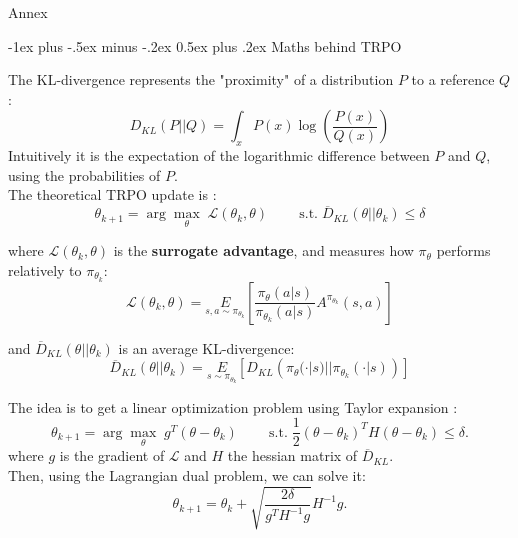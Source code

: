 \documentclass[10pt,landscape]{article}
\makeatletter
\renewcommand{\section}{\@startsection{section}{1}{0mm}%
                                {-1ex plus -.5ex minus -.2ex}%
                                {0.5ex plus .2ex}%
                                {\normalfont\large\bfseries}}
\makeatother
\begin{document}
\newpage

\begin{multicols}{3}

\begin{center}
     \Large{Annex} \\
\end{center}


\section{Maths behind TRPO}

The KL-divergence represents the "proximity" of a distribution $P$ to a reference $Q$ :
$$ D_{KL}(P || Q) = \int_x P(x) \log \left ( \frac{P(x)}{Q(x)} \right )$$
Intuitively it is the expectation of the logarithmic difference between $P$ and $Q$, using the probabilities of $P$.\\
\medskip
The theoretical TRPO update is :
$$\theta_{k+1} = \arg \max_{\theta} \; \mathcal{L}(\theta_k, \theta) \;\;\;\;\;\;\;\;
     \text{s.t.} \;  \overline{D}_{KL}(\theta || \theta_k) \leq \delta $$

where $\mathcal{L}(\theta_k, \theta)$ is the \textbf{surrogate advantage}, and measures how $\pi_\theta$ performs relatively to $\pi_{\theta_k}$:
$$ {\mathcal L}(\theta_k, \theta) = \underset{s,a \sim \pi_{\theta_k}}{E} \left [
    \frac{\pi_{\theta}(a|s)}{\pi_{\theta_k}(a|s)} A^{\pi_{\theta_k}}(s,a) \right ] $$

and $\overline{D}_{KL}(\theta || \theta_k)$ is an average KL-divergence:
$$ \overline{D}_{KL}(\theta || \theta_k) = \underset{s \sim \pi_{\theta_k}}{E} \left [
    D_{KL}\left(\pi_{\theta}(\cdot|s) || \pi_{\theta_k} (\cdot|s) \right) \right ] $$

The idea is to get a linear optimization problem using Taylor expansion :
$$ \theta_{k+1} = \arg \max_{\theta} \; g^T (\theta - \theta_k) \;\;\;\;\;\;\;\;
\text{s.t.} \; \frac{1}{2} (\theta - \theta_k)^T H (\theta - \theta_k) \leq \delta. $$
where $g$ is the gradient of $\mathcal{L}$ and $H$ the hessian matrix of $\overline{D}_{KL}$.\\

Then, using the Lagrangian dual problem, we can solve it:
$$ \theta_{k+1} = \theta_k + \sqrt{\frac{2 \delta}{g^T H^{-1} g}} H^{-1} g. $$


\end{multicols}
\end{document}
